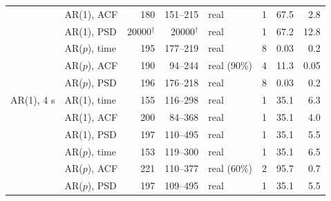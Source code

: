\begin{table}[h]
\begin{tabular}{llrrlrrr}
 & AR(1), ACF & 180 & 151--215 & real & 1 & 67.5 & 2.8 \\
 & AR(1), PSD & 20000$^\dagger$ & 20000$^\dagger$ & real & 1 & 67.2 & 12.8 \\
 & AR($p$), time & 195 & 177--219 & real & 8 & 0.03 & 0.2 \\
 & AR($p$), ACF & 190 & 94--244 & real (90\%) & 4 & 11.3 & 0.05 \\
 & AR($p$), PSD & 196 & 176--218 & real & 8 & 0.03 & 0.2 \\
\midrule
AR(1), 4 s & AR(1), time & 155 & 116--298 & real & 1 & 35.1 & 6.3 \\
 & AR(1), ACF & 200 & 84--368 & real & 1 & 35.1 & 4.0 \\
 & AR(1), PSD & 197 & 110--495 & real & 1 & 35.1 & 5.5 \\
 & AR($p$), time & 153 & 119--300 & real & 1 & 35.1 & 6.5 \\
 & AR($p$), ACF & 221 & 110--377 & real (60\%) & 2 & 95.7 & 0.7 \\
 & AR($p$), PSD & 197 & 109--495 & real & 1 & 35.1 & 5.5 \\
\bottomrule
\end{tabular}
\end{table}
